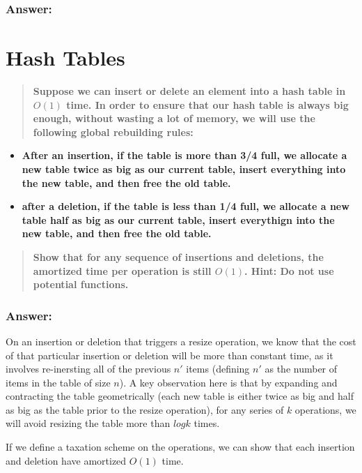 \documentclass[titlepage]{article}\usepackage[]{graphicx}\usepackage[]{color}
\begin{document}
\subsubsection{Answer: }

\section{Hash Tables}
\begin{quote}
  \textbf{Suppose we can insert or delete an element into a hash table in
	$O(1)$ time. In order to ensure that our hash table is always big enough,
	without wasting a lot of memory, we will use the following global
  rebuilding rules:}
\end{quote}

\begin{itemize}
	\item \textbf{After an insertion, if the table is more than 3/4 full, we
			allocate a new table twice as big as our current table, insert
		everything into the new table, and then free the old table.}
	\item \textbf{ after a deletion, if the table is less than 1/4 full, we
			allocate a new table half as big as our current table, insert
		everythign into the new table, and then free the old table.}
\end{itemize}
\begin{quote}
	\textbf{Show that for any sequence of insertions and deletions, the
		amortized time per operation is still $O(1)$. Hint: Do not use
	potential functions.}
\end{quote}

\subsubsection{Answer:}
On an insertion or deletion that triggers a resize operation, we know that the
cost of that particular insertion or deletion will be more than constant time,
as it involves re-inersting all of the previous $n'$ items (defining $n'$ as
the number of items in the table of size $n$). A key observation here is that
by expanding and contracting the table geometrically (each new table is either 
twice as big and half as big as the table prior to the resize operation), for
any series of $k$ operations, we will avoid resizing the table more than $log k$ 
times. 

If we define a taxation scheme on the operations, we can show that each
insertion and deletion have amortized $O(1)$ time. 
\end{document}
